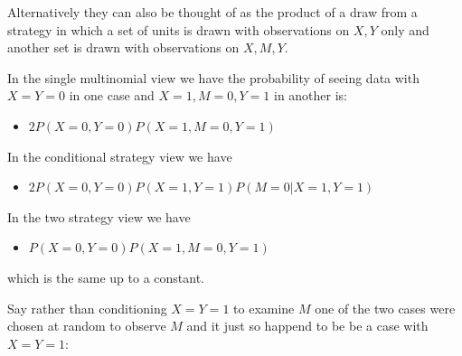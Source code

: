 \documentclass[
  12pt,
]{book}
\providecommand{\tightlist}{%
  \setlength{\itemsep}{0pt}\setlength{\parskip}{0pt}}
\begin{document}
Alternatively they can also be thought of as the product of a draw from a strategy in which a set of units is drawn with observations on \(X,Y\) only and another set is drawn with observations on \(X, M,Y\).

In the single multinomial view we have the probability of seeing data with \(X=Y=0\) in one case and \(X=1, M=0, Y=1\) in another is:

\begin{itemize}
\tightlist
\item
  \(2P(X=0, Y=0)P(X=1, M=0, Y=1)\)
\end{itemize}

In the conditional strategy view we have

\begin{itemize}
\tightlist
\item
  \(2P(X=0, Y=0)P(X=1, Y=1)P(M=0 | X=1, Y=1)\)
\end{itemize}

In the two strategy view we have

\begin{itemize}
\tightlist
\item
  \(P(X=0, Y=0)P(X=1, M=0, Y=1)\)
\end{itemize}

which is the same up to a constant.

Say rather than conditioning \(X=Y=1\) to examine \(M\) one of the two cases were chosen at random to observe \(M\) and it just so happend to be be a case with \(X=Y=1\):
\end{document}
